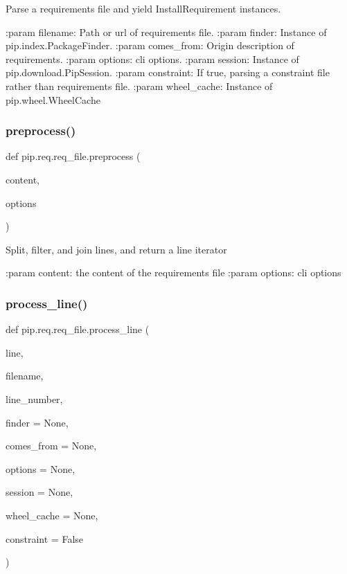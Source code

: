 \begin{DoxyVerb}Parse a requirements file and yield InstallRequirement instances.

:param filename:    Path or url of requirements file.
:param finder:      Instance of pip.index.PackageFinder.
:param comes_from:  Origin description of requirements.
:param options:     cli options.
:param session:     Instance of pip.download.PipSession.
:param constraint:  If true, parsing a constraint file rather than
    requirements file.
:param wheel_cache: Instance of pip.wheel.WheelCache
\end{DoxyVerb}
 \mbox{\label{namespacepip_1_1req_1_1req__file_ac799b15c47125fbf6f77cf0d9ffbe772}} 
\subsubsection{\texorpdfstring{preprocess()}{preprocess()}}
{\footnotesize\ttfamily def pip.\+req.\+req\+\_\+file.\+preprocess (\begin{DoxyParamCaption}\item[{}]{content,  }\item[{}]{options }\end{DoxyParamCaption})}

\begin{DoxyVerb}Split, filter, and join lines, and return a line iterator

:param content: the content of the requirements file
:param options: cli options
\end{DoxyVerb}
 \mbox{\label{namespacepip_1_1req_1_1req__file_ab31bf471d559b7e62eeefa77fe230dd2}} 
\subsubsection{\texorpdfstring{process\+\_\+line()}{process\_line()}}
{\footnotesize\ttfamily def pip.\+req.\+req\+\_\+file.\+process\+\_\+line (\begin{DoxyParamCaption}\item[{}]{line,  }\item[{}]{filename,  }\item[{}]{line\+\_\+number,  }\item[{}]{finder = {\ttfamily None},  }\item[{}]{comes\+\_\+from = {\ttfamily None},  }\item[{}]{options = {\ttfamily None},  }\item[{}]{session = {\ttfamily None},  }\item[{}]{wheel\+\_\+cache = {\ttfamily None},  }\item[{}]{constraint = {\ttfamily False} }\end{DoxyParamCaption})}

